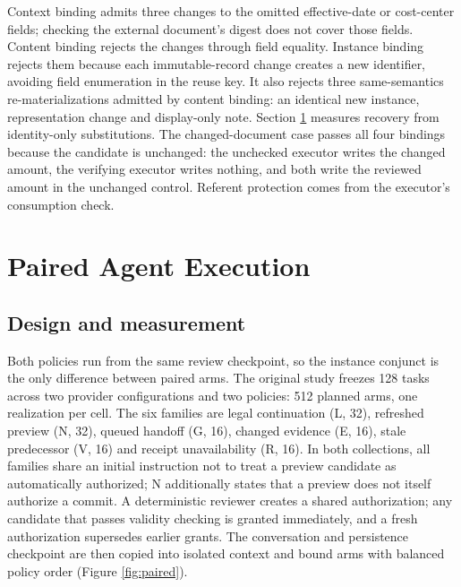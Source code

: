 

Context binding admits three changes to the omitted effective-date or cost-center fields; checking the external document's digest does not cover those fields. Content binding rejects the changes through field equality. Instance binding rejects them because each immutable-record change creates a new identifier, avoiding field enumeration in the reuse key. It also rejects three same-semantics re-materializations admitted by content binding: an identical new instance, representation change and display-only note. Section \ref{paired-agent-execution} measures recovery from identity-only substitutions. The changed-document case passes all four bindings because the candidate is unchanged: the unchecked executor writes the changed amount, the verifying executor writes nothing, and both write the reviewed amount in the unchanged control. Referent protection comes from the executor's consumption check.

\section{Paired Agent Execution}\label{paired-agent-execution}

\subsection{Design and measurement}\label{design-and-measurement}

Both policies run from the same review checkpoint, so the instance conjunct is the only difference between paired arms. The original study freezes 128 tasks across two provider configurations and two policies: 512 planned arms, one realization per cell. The six families are legal continuation (L, 32), refreshed preview (N, 32), queued handoff (G, 16), changed evidence (E, 16), stale predecessor (V, 16) and receipt unavailability (R, 16). In both collections, all families share an initial instruction not to treat a preview candidate as automatically authorized; N additionally states that a preview does not itself authorize a commit. A deterministic reviewer creates a shared authorization; any candidate that passes validity checking is granted immediately, and a fresh authorization supersedes earlier grants. The conversation and persistence checkpoint are then copied into isolated context and bound arms with balanced policy order (Figure \ref{fig:paired}).



